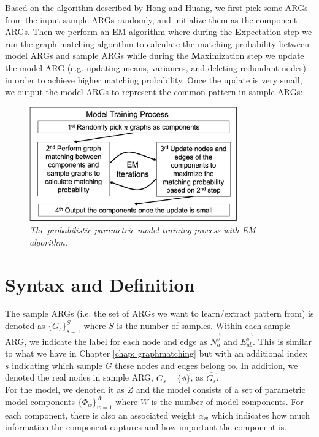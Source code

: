 Based on the algorithm described by Hong and Huang, we first pick some ARGs from the input sample ARGs randomly, and initialize them as the component ARGs. Then we perform an EM algorithm where during the \textbf{E}xpectation step we run the graph matching algorithm to calculate the matching probability between model ARGs and sample ARGs while during the \textbf{M}aximization step we update the model ARG (e.g. updating means, variances, and deleting redundant nodes) in order to achieve higher matching probability. Once the update is very small, we output the model ARGs to represent the common pattern in sample ARGs:\\

\begin{figure}[h]
	\centering
	\captionsetup{justification=centering}
	\includegraphics[width=0.8\textwidth]{figs/model_training.png}
	\caption[Caption for LOF]{\emph{The probabilistic parametric model training process with EM algorithm.}}
	\label{fig:model_training}
\end{figure}

\section{Syntax and Definition}

The sample ARGs (i.e. the set of ARGs we want to learn/extract pattern from) is denoted as $\{G_s\}_{s=1}^S$ where $S$ is the number of samples. Within each sample ARG, we indicate the label for each node and edge as $\overrightarrow{N^s_a}$ and $\overrightarrow{E^s_{ab}}$. This is similar to what we have in Chapter \ref{chap: graphmatching} but with an additional index $s$ indicating which sample $G$ these nodes and edges belong to. In addition, we denoted the real nodes in sample ARG, $G_s-\{\phi\}$, as $\widehat{G_s}$.\\

For the model, we denoted it as $Z$ and the model consists of a set of parametric model components $\{\Phi_w\}_{w=1}^W$ where $W$ is the number of model components. For each component, there is also an associated weight $\alpha_w$ which indicates how much information the component captures and how important the component is.\\

